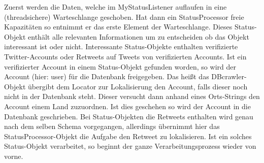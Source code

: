 Zuerst werden die Daten, welche im MyStatusListener auflaufen in eine (threadsichere) Warteschlange geschoben.
Hat dann ein StatusProcessor freie Kapazitäten so entnimmt er das erste Element der Warteschlange. Dieses Status-Objekt enthält alle relevanten Informationen um zu entscheiden ob das Objekt interessant ist oder nicht.
Interessante Status-Objekte enthalten verifizierte Twitter-Accounts oder Retweets auf Tweets von verifizierten Accounts. Ist ein verifizierter Account in einem Status-Objekt gefunden worden, so wird der Account (hier: user) für die Datenbank freigegeben. Das heißt das DBcrawler-Objekt übergibt
dem Locator zur Lokalisierung den Account, falls dieser noch nicht in der Datenbank steht. Dieser versucht dann anhand eines Orts-Strings den Account einem Land zuzuordnen. Ist dies geschehen so wird der Account in die Datenbank geschrieben. 
Bei Status-Objekten die Retweets enthalten wird genau nach dem selben Schema vorgegangen, allerdings übernimmt hier das StatusProcessor-Objekt die Aufgabe den Retweet zu lokalisieren.
Ist ein solches Status-Objekt verarbeitet, so beginnt der ganze Verarbeitungsprozess wieder von vorne.
